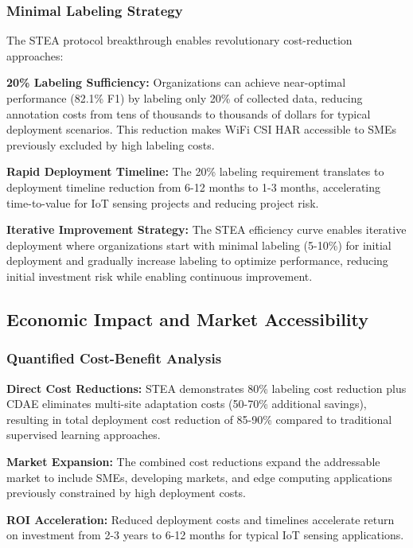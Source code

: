 \documentclass[journal]{IEEEtran}
\begin{document}
\subsubsection{Minimal Labeling Strategy}

The STEA protocol breakthrough enables revolutionary cost-reduction approaches:

\textbf{20\% Labeling Sufficiency:} Organizations can achieve near-optimal performance (82.1\% F1) by labeling only 20\% of collected data, reducing annotation costs from tens of thousands to thousands of dollars for typical deployment scenarios. This reduction makes WiFi CSI HAR accessible to SMEs previously excluded by high labeling costs.

\textbf{Rapid Deployment Timeline:} The 20\% labeling requirement translates to deployment timeline reduction from 6-12 months to 1-3 months, accelerating time-to-value for IoT sensing projects and reducing project risk.

\textbf{Iterative Improvement Strategy:} The STEA efficiency curve enables iterative deployment where organizations start with minimal labeling (5-10\%) for initial deployment and gradually increase labeling to optimize performance, reducing initial investment risk while enabling continuous improvement.

\subsection{Economic Impact and Market Accessibility}

\subsubsection{Quantified Cost-Benefit Analysis}

\textbf{Direct Cost Reductions:} STEA demonstrates 80\% labeling cost reduction plus CDAE eliminates multi-site adaptation costs (50-70\% additional savings), resulting in total deployment cost reduction of 85-90\% compared to traditional supervised learning approaches.

\textbf{Market Expansion:} The combined cost reductions expand the addressable market to include SMEs, developing markets, and edge computing applications previously constrained by high deployment costs.

\textbf{ROI Acceleration:} Reduced deployment costs and timelines accelerate return on investment from 2-3 years to 6-12 months for typical IoT sensing applications.
\end{document}

